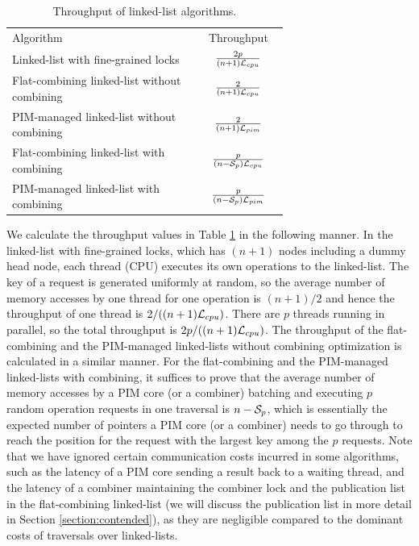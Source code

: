 \renewcommand{\arraystretch}{1.8}
\begin{table}[ht!]
\begin{center}
	\begin{tabular}{| m{0.68\linewidth}  | c |}    
    \hline
    Algorithm & Throughput\\ \hhline{|=|=|}
    Linked-list with fine-grained locks & ${2p \over (n+1)\mathcal{L}_{cpu}}$ \\ \hline
    Flat-combining linked-list without combining & ${2 \over (n+1)\mathcal{L}_{cpu}}$ \\ \hline
    PIM-managed linked-list without combining & ${2 \over (n+1)\mathcal{L}_{pim}}$ \\ \hline
    Flat-combining linked-list with combining & ${p \over (n-\mathcal{S}_{p})\mathcal{L}_{cpu}}$ \\ \hline
    PIM-managed linked-list with combining & ${p \over (n-\mathcal{S}_{p})\mathcal{L}_{pim}}$ \\ \hline
    \end{tabular}
\end{center}
\caption{Throughput of linked-list algorithms.}
\label{tab:linkedlist}
\end{table}

We calculate the throughput values in Table \ref{tab:linkedlist} in the following manner. 
In the linked-list with fine-grained locks, which has $(n+1)$ nodes including 
a dummy head node, each thread (CPU) executes its own operations to the linked-list. 
The key of a request is generated uniformly at random, 
so the average number of memory accesses by one thread for one operation is $(n+1)/2$ 
and hence the throughput of one thread is $2/((n+1)\mathcal{L}_{cpu})$. 
There are $p$ threads running in parallel, so the total throughput is $2p/((n+1)\mathcal{L}_{cpu})$. 
The throughput of the flat-combining and the PIM-managed linked-lists without combining optimization 
is calculated in a similar manner. 
For the flat-combining and the PIM-managed linked-lists with combining, it suffices to prove that
the average number of memory accesses by a PIM core (or a combiner) batching and executing 
$p$ random operation requests in one traversal is $n - \mathcal{S}_{p}$, 
which is essentially the expected number of pointers a PIM core (or a combiner) 
needs to go through to reach the position for the request with the largest key among the $p$ requests. 
Note that we have ignored certain communication costs incurred in some algorithms, 
such as the latency of a PIM core sending a result back to a waiting thread, 
and the latency of a combiner maintaining the combiner lock and the publication list in the flat-combining 
linked-list (we will discuss the publication list in more detail in Section \ref{section:contended}), 
as they are negligible compared to the dominant costs of traversals over linked-lists.
 
